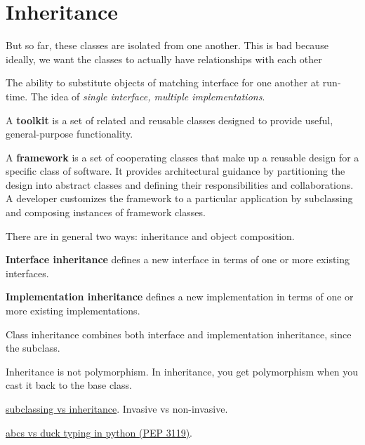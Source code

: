 \section{Inheritance} 

  But so far, these classes are isolated from one another. This is bad because ideally, we want the classes to actually have relationships with each other 

  \begin{definition}[Polymorphism] 
    The ability to substitute objects of matching interface for one another at run-time. 
    The idea of \textit{single interface, multiple implementations}. 
  \end{definition}

  \begin{definition}[Toolkit]
    A \textbf{toolkit} is a set of related and reusable classes designed to provide useful, general-purpose functionality. 
  \end{definition}

  \begin{definition}[Framework]
    A \textbf{framework} is a set of cooperating classes that make up a reusable design for a specific class of software. It provides architectural guidance by partitioning the design into abstract classes and defining their responsibilities and collaborations. A developer customizes the framework to a particular application by subclassing and composing instances of framework classes. 
  \end{definition} 

  There are in general two ways: inheritance and object composition. 

  \begin{definition} 
    \textbf{Interface inheritance} defines a new interface in terms of one or more existing interfaces. 
  \end{definition}

  \begin{definition}
    \textbf{Implementation inheritance} defines a new implementation in terms of one or more existing implementations. 
  \end{definition}  

  Class inheritance combines both interface and implementation inheritance, since the subclass.  

  Inheritance is not polymorphism. In inheritance, you get polymorphism when you cast it back to the base class. 

  \href{https://stackoverflow.com/questions/3392352/python-abcs-registering-vs-subclassing}{subclassing vs inheritance}. Invasive vs non-invasive. 
 
  \href{https://peps.python.org/pep-3119/#abcs-vs-duck-typing}{abcs vs duck typing in python (PEP 3119)}.
